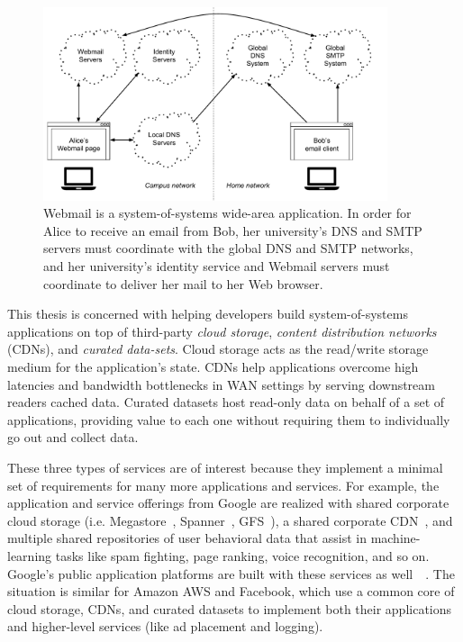 \begin{figure}[h]
   \centering
   \includegraphics[width=0.9\textwidth,page=1]{figures/dissertation-figures}
   \caption{Webmail is a system-of-systems wide-area application.  In order for
   Alice to receive an email from Bob, her university's DNS and SMTP servers
   must coordinate with the global DNS and SMTP networks, and her university's
   identity service and Webmail servers must coordinate to deliver her mail to
   her Web browser.}
   \label{fig:chap1-system-of-systems}
\end{figure}

This thesis is concerned with helping developers build
system-of-systems applications on top of third-party \emph{cloud storage},
\emph{content distribution networks} (CDNs), and \emph{curated data-sets}.
Cloud storage acts as the read/write storage medium for the
application's state.  CDNs help applications overcome high latencies and
bandwidth bottlenecks in WAN settings by serving downstream readers cached data.
Curated datasets host read-only data on behalf of a set of applications, providing value
to each one without requiring them to individually go out and
collect data.

These three types of services are of interest because they implement a
minimal set of requirements for many more applications and services.  For
example, the application and service offerings from Google are
realized with shared corporate cloud storage (i.e. Megastore~\cite{megastore},
Spanner~\cite{spanner}, GFS~\cite{gfs}), a shared corporate
CDN~\cite{google-cdn}, and multiple shared repositories of user behavioral data
that assist in machine-learning tasks like 
spam fighting, page ranking, voice recognition, and so on.  Google's public application
platforms are built with these services as
well~\cite{google-appengine}~\cite{google-cloud}.  The situation is similar for
Amazon AWS and Facebook, which use a common core of cloud storage, CDNs, and
curated datasets to implement both their applications and 
higher-level services (like ad placement and logging).

